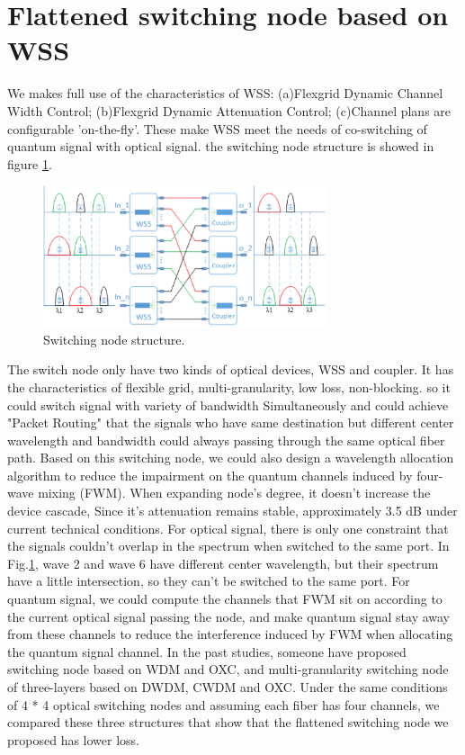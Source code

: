 \documentclass[letterpaper,10pt]{article}
\begin{document}
\section{Flattened switching node based on WSS}
We makes full use of the characteristics of WSS: (a)Flexgrid Dynamic Channel Width Control; (b)Flexgrid Dynamic Attenuation Control; (c)Channel plans are configurable 'on-the-fly'. These make WSS meet the needs of co-switching of quantum signal with optical signal. the switching node structure is showed in figure \ref{fig:switching_node_structure}.
\begin{figure}[htbp]
  \centering
  \includegraphics[width=8.3cm]{swtiching_node_struct}
  \caption{Switching node structure.} \label{fig:switching_node_structure}
\end{figure}
The switch node only have two kinds of optical devices, WSS and coupler. It has the characteristics of flexible grid, multi-granularity, low loss, non-blocking. so it could switch signal with variety of bandwidth Simultaneously and could achieve "Packet Routing" that the signals who have same destination but different center wavelength and bandwidth could always passing through the same optical fiber path. Based on this switching node, we could also design a wavelength allocation algorithm to reduce the impairment on the quantum channels induced by four-wave mixing (FWM). When expanding node's degree, it doesn't increase the device cascade, Since it's attenuation remains stable, approximately 3.5 dB under current technical conditions.
For optical signal, there is only one constraint that the signals couldn't overlap in the spectrum when switched to the same port. In Fig.\ref{fig:switching_node_structure}, wave 2 and wave 6 have different center wavelength, but their spectrum have a little intersection, so they can't be switched to the same port. For quantum signal, we could compute the channels that FWM sit on according to the current optical signal passing the node, and make quantum signal stay away from these channels to reduce the interference induced by FWM when allocating the quantum signal channel. In the past studies, someone have proposed switching node based on WDM and OXC, and multi-granularity switching node of three-layers based on DWDM, CWDM and OXC. Under the same conditions of 4 * 4 optical switching nodes and assuming each fiber has four channels, we compared these three structures that show that the flattened switching node we proposed has lower loss.
\end{document}
